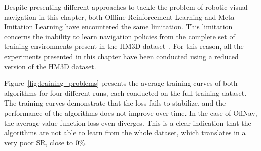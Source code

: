 Despite presenting different approaches to tackle the problem of robotic visual navigation in this chapter, both Offline Reinforcement Learning and Meta Imitation Learning have encountered the same limitation.
This limitation concerns the inability to learn navigation policies from the complete set of training environments present in the HM3D dataset~\cite{Ramakrishnan2021HabitatMatterport3D}.
For this reason, all the experiments presented in this chapter have been conducted using a reduced version of the HM3D dataset.

Figure~\ref{fig:training_problems} presents the average training curves of both algorithms for four different runs, each conducted on the full training dataset.
The training curves demonstrate that the loss fails to stabilize, and the performance of the algorithms does not improve over time.
In the case of OffNav, the average value function loss even diverges.
This is a clear indication that the algorithms are not able to learn from the whole dataset, which translates in a very poor SR, close to 0\%.


